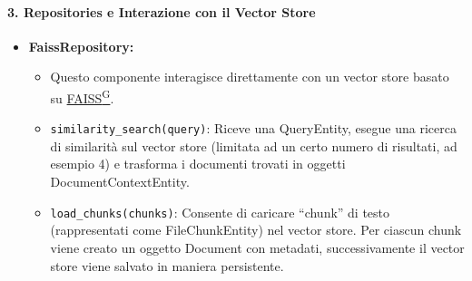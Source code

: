     \paragraph{3. Repositories e Interazione con il Vector Store}
    \begin{itemize}
        \item \textbf{FaissRepository:}
        \begin{itemize}
            \item Questo componente interagisce direttamente con un vector store basato su \href{https://code7crusaders.github.io/docs/\href{https://code7crusaders.github.io/docs/PB/documentazione_interna/glossario.html#pb-product-baseline}{PB\textsuperscript{G}}/documentazione_interna/glossario.html#faiss}{FAISS\textsuperscript{G}}.
            \item \texttt{similarity\_search(query)}: Riceve una QueryEntity, esegue una ricerca di similarità sul vector store (limitata ad un certo numero di risultati, ad esempio 4) e trasforma i documenti trovati in oggetti DocumentContextEntity.
            \item \texttt{load\_chunks(chunks)}: Consente di caricare “chunk” di testo (rappresentati come FileChunkEntity) nel vector store. Per ciascun chunk viene creato un oggetto Document con metadati, successivamente il vector store viene salvato in maniera persistente.
        \end{itemize}
    \end{itemize}

